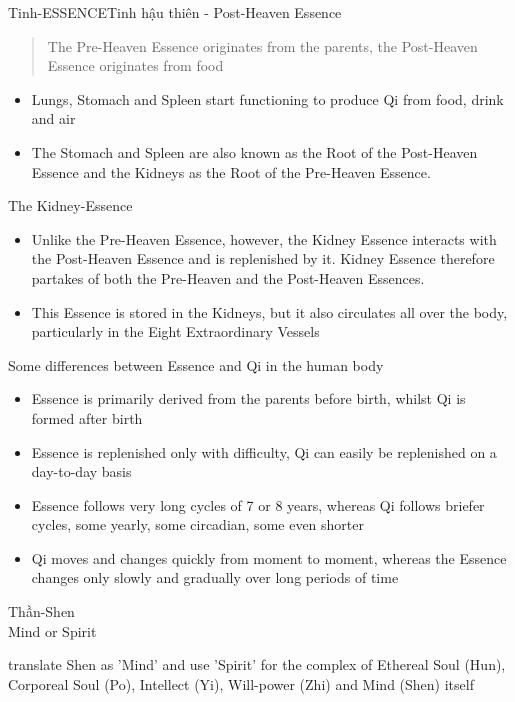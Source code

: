 \documentclass[
	11pt, %
]{beamer}
\theoremstyle{newblock}
\begin{document}
\begin{frame}{Tinh-ESSENCE}{Tinh hậu thiên - Post-Heaven Essence}
\begin{quote}
	The Pre-Heaven Essence originates from the parents, the Post-Heaven Essence originates from food
\end{quote}
\begin{itemize}
	\item Lungs, Stomach and Spleen start functioning to produce Qi from food, drink and air
	\item The Stomach and Spleen are also known as the Root of the Post-Heaven
	Essence and the Kidneys as the Root of the Pre-Heaven Essence.
\end{itemize}
\end{frame}
\begin{frame}{The Kidney-Essence}
	\begin{itemize}
		\item Unlike the Pre-Heaven Essence, however, the Kidney Essence interacts with the Post-Heaven Essence and is replenished by it.
		Kidney Essence therefore partakes of both the Pre-Heaven and the Post-Heaven Essences.
		\item This Essence is stored in the Kidneys, but it also circulates all over the body, particularly in the Eight Extraordinary Vessels
	\end{itemize}
\end{frame}
\begin{frame}{Some differences between Essence and Qi in the human body}
	\begin{block}{}
		\begin{itemize}
			\item Essence is primarily derived from the parents before birth, 
			whilst Qi is formed after birth
			\item Essence is replenished only with difficulty, Qi can easily be 
			replenished on a day-to-day basis
			\item Essence follows very long cycles of 7 or 8 years, whereas Qi 
			follows briefer cycles, some yearly, some circadian, some 
			even shorter
			\item Qi moves and changes quickly from moment to moment, 
			whereas the Essence changes only slowly and gradually 
			over long periods of time
		\end{itemize}		
	\end{block}
\end{frame}
\begin{frame}[plain]
	\Huge{Thần-Shen}\\
	\Large{Mind or Spirit}\\
	\begin{block}{}
		translate Shen as 'Mind' and use 'Spirit' for the complex of 
Ethereal Soul (Hun), Corporeal Soul (Po), Intellect (Yi), 
Will-power (Zhi) and Mind (Shen) itself
	\end{block}
\end{frame}
\end{document}
